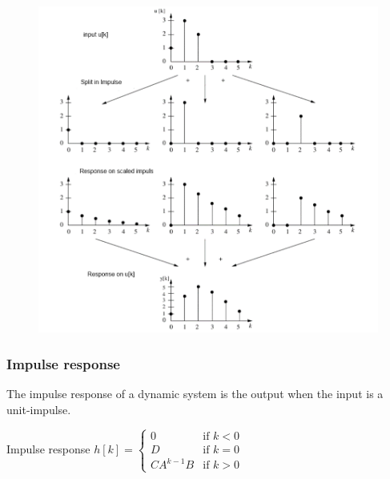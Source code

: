 \begin{frame}
	\begin{figure}
\centering
\includegraphics[height=0.9\textheight]{Images/discrete_time_systems_20}

\end{figure}

\end{frame}
\begin{frame}
	\frametitle{Impulse response}
	\begin{definition}
		The impulse response of a dynamic system is  the output when the input is a unit-impulse.
	\end{definition}
	\begin{block}{Impulse response}
		$h[k] = \begin{cases}
			0  & \text{if } k <  0 \\
			D & \text{if } k= 0 \\ 
			CA^{k-1}B & \text{if } k> 0 
		\end{cases}$
	\end{block}
\end{frame}
